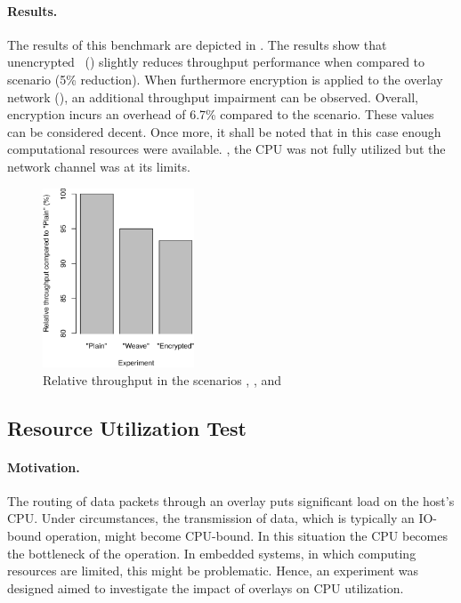 \paragraph{Results.}
The results of this benchmark are depicted in . The results show that unencrypted \wnet\ () slightly reduces throughput performance when compared to  scenario (5\% reduction). When furthermore encryption is applied to the overlay network (), an additional throughput impairment can be observed. Overall, encryption incurs an overhead of 6.7\% compared to the  scenario. These values can be considered decent. Once more, it shall be noted that in this case enough computational resources were available. \Ie , the CPU was not fully utilized but the network channel was at its limits.
\begin{figure}[htpb]
  \centering
  \includegraphics[width=0.4\textwidth]{figures/throughput}
  \caption[\weave\ throughput benchmark results]{Relative throughput in the scenarios , , and }\label{fig:throughput}
\end{figure}
%
%
%
%
%
%
%
%
%
%
\subsection{Resource Utilization Test} \label{sec:utilization}
\paragraph{Motivation.} The routing of data packets through an overlay puts significant load on the host's CPU. Under circumstances, the transmission of data, which is typically an IO-bound operation, might become CPU-bound. In this situation the CPU becomes the bottleneck of the operation. In embedded systems, in which computing resources are limited, this might be problematic. Hence, an experiment was designed aimed to investigate the impact of overlays on CPU utilization.

